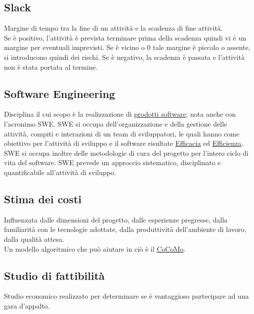 	\subsection{Slack}
	\label{sec:slack}
	Margine di tempo tra la fine di un attività e la scadenza di fine attività. \\
	Se è positivo, l'attività è prevista terminare prima della scadenza quindi vi è un margine per eventuali imprevisti. Se è vicino o 0 tale margine è piccolo o assente, si introducono quindi dei rischi. Se è negativo, la scadenza è passata e l'attività non è stata portata al termine.
	
	\subsection{Software Engineering}
	\label{sec:swe}
	Disciplina il cui scopo è la realizzazione di  \underline{\hyperref[sec:prodottosoftware]{prodotti software}}; nota anche con l'acronimo SWE.
	SWE si occupa dell'organizzazione e della gestione delle attività, compiti e interazioni di un team di sviluppatori,
	le quali hanno come obiettivo per l'attività di sviluppo e il software risultate \underline{\hyperref[sec:efficacia]{Efficacia}} ed \underline{\hyperref[sec:efficienza]{Efficienza}}.	
	SWE si occupa inoltre delle metodologie di cura del progetto per l'intero ciclo di vita del software.
	SWE prevede un approccio sistematico, disciplinato e quantificabile all'attività di sviluppo.

	\subsection{Stima dei costi}
	\label{sec:stimacosti}
	Influenzata dalle dimensioni del progetto, dalle esperienze pregresse, dalla familiarità con le tecnologie adottate, dalla produttività dell'ambiente di lavoro, dalla qualità attesa. \\Un modello algoritmico che può aiutare in ciò è il \underline{\hyperref[sec:cocomo]{CoCoMo}}.

	\subsection{Studio di fattibilità}
	\label{sec:studiofattibilita}
	Studio economico realizzato per determinare se è vantaggioso partecipare ad una gara d'appalto.\newpage

